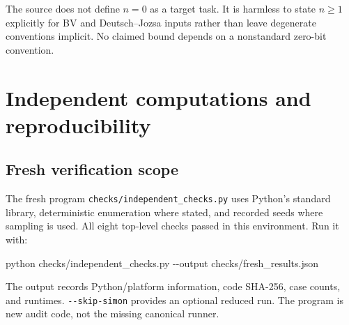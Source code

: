 \documentclass[
  11pt,
]{article}
\newenvironment{Shaded}{}{}
\newcommand{\AttributeTok}[1]{\textcolor[rgb]{0.49,0.56,0.16}{#1}}
\newcommand{\ExtensionTok}[1]{#1}
\newcommand{\NormalTok}[1]{#1}
\begin{document}
The source does not define \(n=0\) as a target task. It is harmless to
state \(n\ge1\) explicitly for BV and Deutsch--Jozsa inputs rather than
leave degenerate conventions implicit. No claimed bound depends on a
nonstandard zero-bit convention.

\section{Independent computations and
reproducibility}\label{independent-computations-and-reproducibility}

\subsection{Fresh verification scope}\label{fresh-verification-scope}

The fresh program \nolinkurl{checks/independent_checks.py} uses Python's
standard library, deterministic enumeration where stated, and recorded
seeds where sampling is used. All eight top-level checks passed in this
environment. Run it with:

\begin{Shaded}
\begin{Highlighting}[]
\ExtensionTok{python}\NormalTok{ checks/independent\_checks.py }\AttributeTok{{-}{-}output}\NormalTok{ checks/fresh\_results.json}
\end{Highlighting}
\end{Shaded}

The output records Python/platform information, code SHA-256, case
counts, and runtimes. \nolinkurl{--skip-simon} provides an optional
reduced run. The program is new audit code, not the missing canonical
runner.
\end{document}
